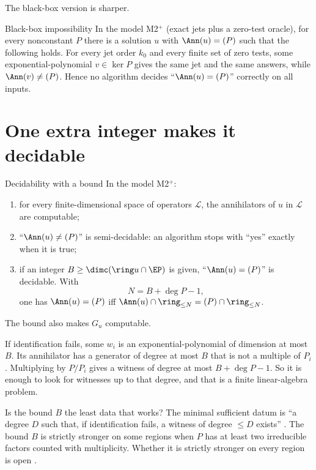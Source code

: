 The black-box version is sharper.

\begin{theorem}{Black-box impossibility  \proved}\label{thm:blackbox}
In the model M2$^+$ (exact jets plus a zero-test oracle), for every nonconstant $P$ there is a solution $u$ with $\Ann(u)=(P)$ such that the following holds. For every jet order $k_0$ and every finite set of zero tests, some exponential-polynomial $v\in\ker P$ gives the same jet and the same answers, while $\Ann(v)\ne(P)$. Hence no algorithm decides ``$\Ann(u)=(P)$'' correctly on all inputs.

\end{theorem}

\section{One extra integer makes it decidable}

\begin{theorem}{Decidability with a bound  \proved}\label{thm:decide}
In the model M2$^+$:
\begin{enumerate}[label=(\roman*)]
\item for every finite-dimensional space of operators $\mathcal L$, the annihilators of $u$ in $\mathcal L$ are computable;
\item ``$\Ann(u)\ne(P)$'' is semi-decidable: an algorithm stops with ``yes'' exactly when it is true;
\item if an integer $B\ge\dimc(\ring u\cap\EP)$ is given, ``$\Ann(u)=(P)$'' is decidable. With
\[
N=B+\deg P-1,
\]
one has $\Ann(u)=(P)$ iff $\Ann(u)\cap\ring_{\le N}=(P)\cap\ring_{\le N}$.
\end{enumerate}
The bound also makes $G_u$ computable.

\end{theorem}

\begin{intuition}
If identification fails, some $w_i$ is an exponential-polynomial of dimension at most $B$. Its annihilator has a generator of degree at most $B$ that is not a multiple of $P_i$. Multiplying by $P/P_i$ gives a witness of degree at most $B+\deg P-1$. So it is enough to look for witnesses up to that degree, and that is a finite linear-algebra problem.
\end{intuition}

Is the bound $B$ the least data that works? The minimal sufficient datum is ``a degree $D$ such that, if identification fails, a witness of degree $\le D$ exists''  \pw. The bound $B$ is strictly stronger on some regions when $P$ has at least two irreducible factors counted with multiplicity. Whether it is strictly stronger on every region is open \openq{} .


